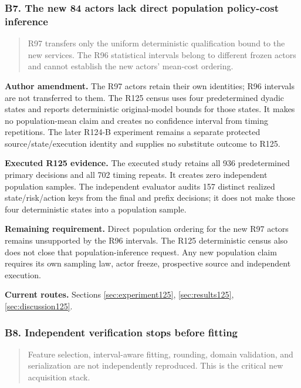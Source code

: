 \subsubsection{B7. The new 84 actors lack direct population policy-cost inference}

\begin{quote}\small
R97 transfers only the uniform deterministic qualification bound to the new services. The R96 statistical intervals belong to different frozen actors and cannot establish the new actors' mean-cost ordering.
\end{quote}

\noindent\textbf{Author amendment.} The R97 actors retain their own identities; R96 intervals are not transferred to them. The R125 census uses four predetermined dyadic states and reports deterministic original-model bounds for those states. It makes no population-mean claim and creates no confidence interval from timing repetitions. The later R124-B experiment remains a separate protected source/state/execution identity and supplies no substitute outcome to R125.

\noindent\textbf{Executed R125 evidence.} The executed study retains all 936 predetermined primary decisions and all 702 timing repeats. It creates zero independent population samples. The independent evaluator audits 157 distinct realized state/risk/action keys from the final and prefix decisions; it does not make those four deterministic states into a population sample.

\noindent\textbf{Remaining requirement.} Direct population ordering for the new R97 actors remains unsupported by the R96 intervals. The R125 deterministic census also does not close that population-inference request. Any new population claim requires its own sampling law, actor freeze, prospective source and independent execution.

\noindent\textbf{Current routes.} Sections \ref{sec:experiment125}, \ref{sec:results125}, \ref{sec:discussion125}.

\subsubsection{B8. Independent verification stops before fitting}

\begin{quote}\small
Feature selection, interval-aware fitting, rounding, domain validation, and serialization are not independently reproduced. This is the critical new acquisition stack.
\end{quote}

